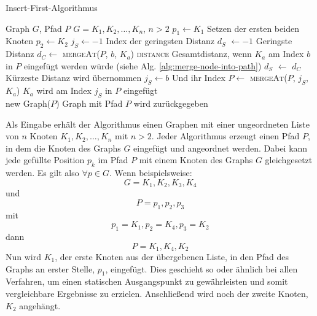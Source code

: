 \begin{algorithm}[H]
    \caption{Insert-First-Algorithmus}
    \label{alg:insert-first}
    \begin{algorithmic}[1]
        \Require Graph $G$, Pfad $P$
        \Require $G = K_1,K_2,\ldots,K_n$, $n > 2$
        \State $p_1 \gets K_1$
        \Comment Setzen der ersten beiden Knoten
        \State $p_2 \gets K_2$
            \State $j_S \gets -1$
            \Comment Index der geringsten Distanz
            \State $d_S$ $\gets -1$
            \Comment Geringste Distanz
                \State $d_C \gets$ \textsc{mergeAt}($P$, $b$, $K_a$) \textsc{distance}
                \Comment Gesamtdistanz, wenn $K_a$ am Index $b$ in $P$ eingefügt werden würde (siehe Alg. \vref{alg:merge-node-into-path})
                    \State $d_S$ $\gets$ $d_C$
                    \Comment Kürzeste Distanz wird übernommen
                    \State $j_S \gets b$
                    \Comment Und ihr Index
                \EndIf
            \EndFor
            \State $P \gets$ \textsc{mergeAt}($P$, $j_S$, $K_a$)
            \Comment $K_a$ wird am Index $j_S$ in $P$ eingefügt
        \EndFor \\
        \Return new Graph($P$)
        \Comment Graph mit Pfad $P$ wird zurückgegeben
    \end{algorithmic}
\end{algorithm}
Als Eingabe erhält der Algorithmus einen Graphen mit einer ungeordneten Liste von $n$ Knoten $K_1,K_2,\ldots,K_n$ mit $n > 2$.
Jeder Algorithmus erzeugt einen Pfad $P$, in dem die Knoten des Graphs $G$ eingefügt und angeordnet werden.
Dabei kann jede gefüllte Position $p_k$ im Pfad $P$ mit einem Knoten des Graphs $G$ gleichgesetzt werden.
Es gilt also $\forall p \in G$.
Wenn beispielsweise:
$$G = K_1,K_2,K_3,K_4$$
und
$$P=p_1,p_2,p_3$$
mit
$$p_1=K_1,p_2=K_4,p_3=K_2$$
dann
$$P=K_1,K_4,K_2$$
Nun wird $K_1$, der erste Knoten aus der übergebenen Liste, in den Pfad des Graphs an erster Stelle, $p_1$, eingefügt. 
Dies geschieht so oder ähnlich bei allen Verfahren, um einen statischen Ausgangspunkt zu gewährleisten und somit vergleichbare Ergebnisse zu erzielen.
Anschließend wird noch der zweite Knoten, $K_2$ angehängt.

